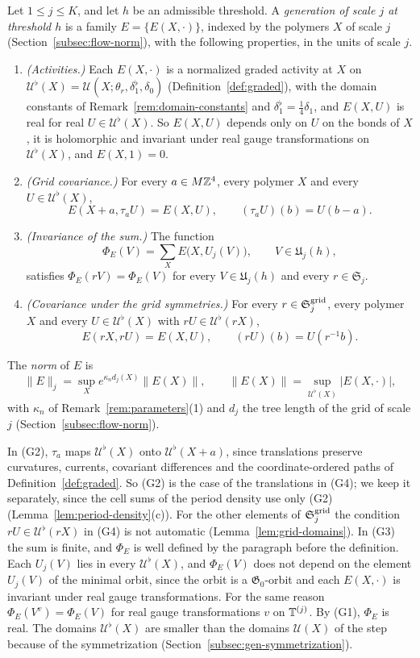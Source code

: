 \begin{definition}[Generation]\label{def:generation}
Let $1\le j\le K$, and let $h$ be an admissible threshold. A \emph{generation of scale $j$ at threshold $h$} is a family $E=\{E(X,\cdot)\}$, indexed by the polymers $X$ of scale $j$ (Section~\ref{subsec:flow-norm}), with the following properties, in the units of scale $j$.
\begin{enumerate}[label=(G\arabic*)]
\item \emph{(Activities.)} Each $E(X,\cdot)$ is a normalized graded activity at $X$ on $\mathcal U^\flat(X)=\mathcal U(X;\theta_r,\delta_1^\flat,\delta_0)$ (Definition~\ref{def:graded}), with the domain constants of Remark~\ref{rem:domain-constants} and $\delta_1^\flat=\frac14\delta_1$, and $E(X,U)$ is real for real $U\in\mathcal U^\flat(X)$. So $E(X,U)$ depends only on $U$ on the bonds of $X$, it is holomorphic and invariant under real gauge transformations on $\mathcal U^\flat(X)$, and $E(X,1)=0$.
\item \emph{(Grid covariance.)} For every $a\in M\mathbb Z^4$, every polymer $X$ and every $U\in\mathcal U^\flat(X)$,
\[
E(X+a,\tau_aU)=E(X,U),\qquad(\tau_aU)(b)=U(b-a).
\]
\item \emph{(Invariance of the sum.)} The function
\[
\Phi_E(V)=\sum_XE\big(X,U_j(V)\big),\qquad V\in\mathfrak U_j(h),
\]
satisfies $\Phi_E(rV)=\Phi_E(V)$ for every $V\in\mathfrak U_j(h)$ and every $r\in\mathfrak S_j$.
\item \emph{(Covariance under the grid symmetries.)} For every $r\in\mathfrak S^{\rm grid}_j$, every polymer $X$ and every $U\in\mathcal U^\flat(X)$ with $rU\in\mathcal U^\flat(rX)$,
\[
E(rX,rU)=E(X,U),\qquad(rU)(b)=U(r^{-1}b).
\]
\end{enumerate}
The \emph{norm} of $E$ is
\[
\|E\|_j=\sup_Xe^{\kappa_nd_j(X)}\|E(X)\|,\qquad\|E(X)\|=\sup_{\mathcal U^\flat(X)}|E(X,\cdot)|,
\]
with $\kappa_n$ of Remark~\ref{rem:parameters}(1) and $d_j$ the tree length of the grid of scale $j$ (Section~\ref{subsec:flow-norm}).
\end{definition}

In (G2), $\tau_a$ maps $\mathcal U^\flat(X)$ onto $\mathcal U^\flat(X+a)$, since translations preserve curvatures, currents, covariant differences and the coordinate-ordered paths of Definition~\ref{def:graded}. So (G2) is the case of the translations in (G4); we keep it separately, since the cell sums of the period density use only (G2) (Lemma~\ref{lem:period-density}(c)). For the other elements of $\mathfrak S^{\rm grid}_j$ the condition $rU\in\mathcal U^\flat(rX)$ in (G4) is not automatic (Lemma~\ref{lem:grid-domains}). In (G3) the sum is finite, and $\Phi_E$ is well defined by the paragraph before the definition. Each $U_j(V)$ lies in every $\mathcal U^\flat(X)$, and $\Phi_E(V)$ does not depend on the element $U_j(V)$ of the minimal orbit, since the orbit is a $\mathfrak G_0$-orbit and each $E(X,\cdot)$ is invariant under real gauge transformations. For the same reason $\Phi_E(V^v)=\Phi_E(V)$ for real gauge transformations $v$ on $\mathbb T^{(j)}$. By (G1), $\Phi_E$ is real. The domains $\mathcal U^\flat(X)$ are smaller than the domains $\mathcal U(X)$ of the step because of the symmetrization (Section~\ref{subsec:gen-symmetrization}).

